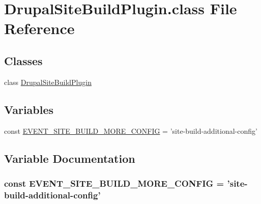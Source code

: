 \hypertarget{DrupalSiteBuildPlugin_8class}{\section{Drupal\-Site\-Build\-Plugin.\-class File Reference}
\label{DrupalSiteBuildPlugin_8class}
}
\subsection*{Classes}
\begin{DoxyCompactItemize}
\item 
class \hyperlink{classDrupalSiteBuildPlugin}{Drupal\-Site\-Build\-Plugin}
\end{DoxyCompactItemize}
\subsection*{Variables}
\begin{DoxyCompactItemize}
\item 
const \hyperlink{DrupalSiteBuildPlugin_8class_a161b884e963e76495607761b557aa6e0}{E\-V\-E\-N\-T\-\_\-\-S\-I\-T\-E\-\_\-\-B\-U\-I\-L\-D\-\_\-\-M\-O\-R\-E\-\_\-\-C\-O\-N\-F\-I\-G} = 'site-\/build-\/additional-\/config'
\end{DoxyCompactItemize}


\subsection{Variable Documentation}
\hypertarget{DrupalSiteBuildPlugin_8class_a161b884e963e76495607761b557aa6e0}{
\subsubsection[{E\-V\-E\-N\-T\-\_\-\-S\-I\-T\-E\-\_\-\-B\-U\-I\-L\-D\-\_\-\-M\-O\-R\-E\-\_\-\-C\-O\-N\-F\-I\-G}]{\setlength{\rightskip}{0pt plus 5cm}const E\-V\-E\-N\-T\-\_\-\-S\-I\-T\-E\-\_\-\-B\-U\-I\-L\-D\-\_\-\-M\-O\-R\-E\-\_\-\-C\-O\-N\-F\-I\-G = 'site-\/build-\/additional-\/config'}}\label{DrupalSiteBuildPlugin_8class_a161b884e963e76495607761b557aa6e0}
